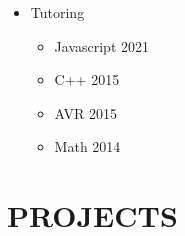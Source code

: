 \documentclass[10pt,a4paper,sans]{moderncv} %
\begin{document}
	\begin{itemize}
		\item Tutoring
		\begin{itemize}
			\item Javascript \hfill 2021
			\item C++ \hfill 2015
			\item AVR \hfill 2015
			\item Math \hfill 2014
		\end{itemize}
    \end{itemize}



	\section{PROJECTS}
	\vspace{0.3em}
\end{document}
